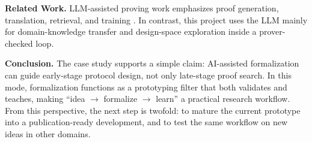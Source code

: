 \documentclass[11pt,a4paper]{article}
\begin{document}
\noindent\textbf{Related Work.}
LLM-assisted proving work emphasizes proof generation, translation, retrieval,
and training \cite{first2023baldur,jiang2023dsp,yang2023leandojo,song2024leancopilot,alphaproof2024}.
In contrast, this project uses the LLM mainly for domain-knowledge transfer and
design-space exploration inside a prover-checked loop.

\noindent\textbf{Conclusion.}
The case study supports a simple claim: AI-assisted formalization can guide
early-stage protocol design, not only late-stage proof search. In this mode,
formalization functions as a prototyping filter that both validates and teaches,
making ``idea $\to$ formalize $\to$ learn'' a practical research workflow.
From this perspective, the next step is twofold: to mature the current prototype
into a publication-ready development, and to test the same workflow on new ideas
in other domains.
\end{document}
